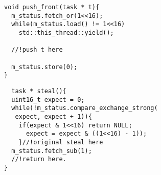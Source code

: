 \newsavebox{\pushfrontlisting}
\begin{lrbox}{\pushfrontlisting}
\begin{lstlisting}
void push_front(task * t){
  m_status.fetch_or(1<<16);
  while(m_status.load() != 1<<16)
    std::this_thread::yield();

  //!push t here

  m_status.store(0);
}
\end{lstlisting}
\end{lrbox}

\newsavebox{\steallisting}
\begin{lrbox}{\steallisting}
\begin{lstlisting}
  task * steal(){
  uint16_t expect = 0;
  while(!m_status.compare_exchange_strong(
   expect, expect + 1)){
    if(expect & 1<<16) return NULL;
      expect = expect & ((1<<16) - 1));
    }//!original steal here
  m_status.fetch_sub(1);
  //!return here.
}
\end{lstlisting}
\end{lrbox}

